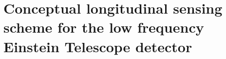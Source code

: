 \chapter{\label{c:et-lf-control}Conceptual longitudinal sensing scheme for the low frequency Einstein Telescope detector}

\newcommand{\AS}{AS}
\newcommand{\POP}{POP}
\newcommand{\REFL}{REFL}

\newcommand{\ASDC}{$\text{\AS}_{\text{DC}}$}
\newcommand{\ASFIRSTI}{$\text{\AS}_{\num{11}}^{\text{I}}$}
\newcommand{\ASFIRSTQ}{$\text{\AS}_{\num{11}}^{\text{Q}}$}
\newcommand{\ASSECONDI}{$\text{\AS}_{\num{57}}^{\text{I}}$}
\newcommand{\ASSECONDQ}{$\text{\AS}_{\num{57}}^{\text{Q}}$}
\newcommand{\ASSUMI}{$\text{\AS}_{\num{68}}^{\text{I}}$}
\newcommand{\ASSUMQ}{$\text{\AS}_{\num{68}}^{\text{Q}}$}
\newcommand{\ASDIFFI}{$\text{\AS}_{\num{45}}^{\text{I}}$}
\newcommand{\ASDIFFQ}{$\text{\AS}_{\num{45}}^{\text{Q}}$}
\newcommand{\POPDC}{$\text{\POP}_{\text{DC}}$}
\newcommand{\POPFIRSTI}{$\text{\POP}_{\num{11}}^{\text{I}}$}
\newcommand{\POPFIRSTQ}{$\text{\POP}_{\num{11}}^{\text{Q}}$}
\newcommand{\POPSECONDI}{$\text{\POP}_{\num{57}}^{\text{I}}$}
\newcommand{\POPSECONDQ}{$\text{\POP}_{\num{57}}^{\text{Q}}$}
\newcommand{\POPSUMI}{$\text{\POP}_{\num{68}}^{\text{I}}$}
\newcommand{\POPSUMQ}{$\text{\POP}_{\num{68}}^{\text{Q}}$}
\newcommand{\POPDIFFI}{$\text{\POP}_{\num{45}}^{\text{I}}$}
\newcommand{\POPDIFFQ}{$\text{\POP}_{\num{45}}^{\text{Q}}$}
\newcommand{\REFLDC}{$\text{\REFL}_{\text{DC}}$}
\newcommand{\REFLFIRSTI}{$\text{\REFL}_{\num{11}}^{\text{I}}$}
\newcommand{\REFLFIRSTQ}{$\text{\REFL}_{\num{11}}^{\text{Q}}$}
\newcommand{\REFLSECONDI}{$\text{\REFL}_{\num{57}}^{\text{I}}$}
\newcommand{\REFLSECONDQ}{$\text{\REFL}_{\num{57}}^{\text{Q}}$}
\newcommand{\REFLSUMI}{$\text{\REFL}_{\num{68}}^{\text{I}}$}
\newcommand{\REFLSUMQ}{$\text{\REFL}_{\num{68}}^{\text{Q}}$}
\newcommand{\REFLDIFFI}{$\text{\REFL}_{\num{45}}^{\text{I}}$}
\newcommand{\REFLDIFFQ}{$\text{\REFL}_{\num{45}}^{\text{Q}}$}

\newcommand{\ASFIRST}{$\text{\AS}_{\num{11}}$}
\newcommand{\ASSECOND}{$\text{\AS}_{\num{57}}$}
\newcommand{\ASSUM}{$\text{\AS}_{\num{68}}$}
\newcommand{\ASDIFF}{$\text{\AS}_{\num{45}}$}
\newcommand{\POPFIRST}{$\text{\POP}_{\num{11}}$}
\newcommand{\POPSECOND}{$\text{\POP}_{\num{57}}$}
\newcommand{\POPSUM}{$\text{\POP}_{\num{68}}$}
\newcommand{\POPDIFF}{$\text{\POP}_{\num{45}}$}
\newcommand{\REFLFIRST}{$\text{\REFL}_{\num{11}}$}
\newcommand{\REFLSECOND}{$\text{\REFL}_{\num{57}}$}
\newcommand{\REFLSUM}{$\text{\REFL}_{\num{68}}$}
\newcommand{\REFLDIFF}{$\text{\REFL}_{\num{45}}$}

